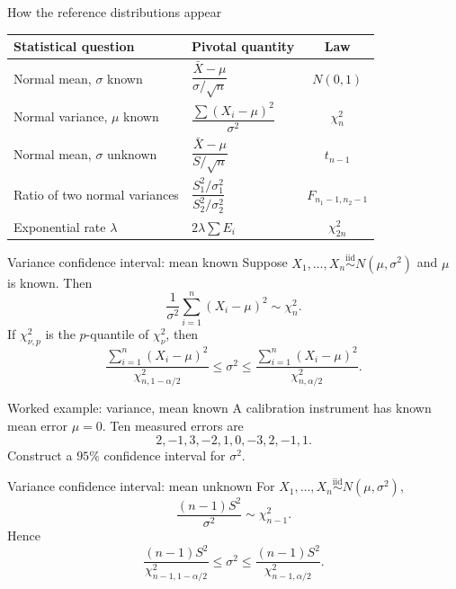 \documentclass[aspectratio=169,11pt]{beamer}
\begin{document}
\begin{frame}{How the reference distributions appear}
  \small
  \renewcommand{\arraystretch}{1.45}
  \begin{tabular}{p{}p{}c}
    \toprule
    \textbf{Statistical question} & \textbf{Pivotal quantity} & \textbf{Law}\\
    \midrule
    Normal mean, $\sigma$ known
      & $\dfrac{\bar X-\mu}{\sigma/\sqrt n}$ & $N(0,1)$\\[.5em]
    Normal variance, $\mu$ known
      & $\dfrac{\sum(X_i-\mu)^2}{\sigma^2}$ & $\chi^2_n$\\[.5em]
    Normal mean, $\sigma$ unknown
      & $\dfrac{\bar X-\mu}{S/\sqrt n}$ & $t_{n-1}$\\[.5em]
    Ratio of two normal variances
      & $\dfrac{S_1^2/\sigma_1^2}{S_2^2/\sigma_2^2}$ & $F_{n_1-1,n_2-1}$\\[.5em]
    Exponential rate $\lambda$
      & $2\lambda\sum E_i$ & $\chi^2_{2n}$\\
    \bottomrule
  \end{tabular}
\end{frame}

\begin{frame}{Variance confidence interval: mean known}
  Suppose $X_1,\dots,X_n\stackrel{\mathrm{iid}}\sim N(\mu,\sigma^2)$ and $\mu$ is known. Then
  \[
    \frac{1}{\sigma^2}\sum_{i=1}^n(X_i-\mu)^2\sim\chi^2_n.
  \]
  If $\chi^2_{\nu,p}$ is the $p$-quantile of $\chi^2_\nu$, then
  \[
    \boxed{
      \frac{\sum_{i=1}^n(X_i-\mu)^2}{\chi^2_{n,1-\alpha/2}}
      \le \sigma^2 \le
      \frac{\sum_{i=1}^n(X_i-\mu)^2}{\chi^2_{n,\alpha/2}}
    }.
  \]
\end{frame}

\begin{frame}{Worked example: variance, mean known}
  A calibration instrument has known mean error $\mu=0$. Ten measured errors are
  \[
    2,-1,3,-2,1,0,-3,2,-1,1.
  \]
  Construct a $95\%$ confidence interval for $\sigma^2$.

\end{frame}

\begin{frame}{Variance confidence interval: mean unknown}
  For $X_1,\dots,X_n\stackrel{\mathrm{iid}}\sim N(\mu,\sigma^2)$,
  \[
    \frac{(n-1)S^2}{\sigma^2}\sim\chi^2_{n-1}.
  \]
  Hence
  \[
    \boxed{
      \frac{(n-1)S^2}{\chi^2_{n-1,1-\alpha/2}}
      \le \sigma^2 \le
      \frac{(n-1)S^2}{\chi^2_{n-1,\alpha/2}}
    }.
  \]
\end{frame}
\end{document}
